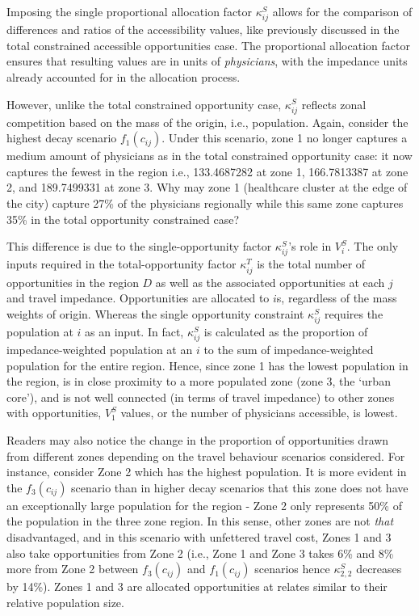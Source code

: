 \documentclass[
  10pt,
  letterpaper,
]{article}
\begin{document}
Imposing the single proportional allocation factor \(\kappa^S_{ij}\)
allows for the comparison of differences and ratios of the accessibility
values, like previously discussed in the total constrained accessible
opportunities case. The proportional allocation factor ensures that
resulting values are in units of \emph{physicians}, with the impedance
units already accounted for in the allocation process.

However, unlike the total constrained opportunity case,
\(\kappa^S_{ij}\) reflects zonal competition based on the mass of the
origin, i.e., population. Again, consider the highest decay scenario
\(f_1(c_{ij})\). Under this scenario, zone 1 no longer captures a medium
amount of physicians as in the total constrained opportunity case: it
now captures the fewest in the region i.e., 133.4687282 at zone 1,
166.7813387 at zone 2, and 189.7499331 at zone 3. Why may zone 1
(healthcare cluster at the edge of the city) capture 27\% of the
physicians regionally while this same zone captures 35\% in the total
opportunity constrained case?

This difference is due to the single-opportunity factor
\(\kappa^S_{ij}\)'s role in \(V_i^S\). The only inputs required in the
total-opportunity factor \(\kappa^T_{ij}\) is the total number of
opportunities in the region \(D\) as well as the associated
opportunities at each \(j\) and travel impedance. Opportunities are
allocated to \(i\)s, regardless of the mass weights of origin. Whereas
the single opportunity constraint \(\kappa^S_{ij}\) requires the
population at \(i\) as an input. In fact, \(\kappa^S_{ij}\) is
calculated as the proportion of impedance-weighted population at an
\(i\) to the sum of impedance-weighted population for the entire region.
Hence, since zone 1 has the lowest population in the region, is in close
proximity to a more populated zone (zone 3, the `urban core'), and is
not well connected (in terms of travel impedance) to other zones with
opportunities, \(V_{1}^S\) values, or the number of physicians
accessible, is lowest.

Readers may also notice the change in the proportion of opportunities
drawn from different zones depending on the travel behaviour scenarios
considered. For instance, consider Zone 2 which has the highest
population. It is more evident in the \(f_3(c_{ij})\) scenario than in
higher decay scenarios that this zone does not have an exceptionally
large population for the region - Zone 2 only represents 50\% of the
population in the three zone region. In this sense, other zones are not
\emph{that} disadvantaged, and in this scenario with unfettered travel
cost, Zones 1 and 3 also take opportunities from Zone 2 (i.e., Zone 1
and Zone 3 takes 6\% and 8\% more from Zone 2 between \(f_3(c_{ij})\)
and \(f_1(c_{ij})\) scenarios hence \(\kappa_{2,2}^S\) decreases by
14\%). Zones 1 and 3 are allocated opportunities at relates similar to
their relative population size.
\end{document}
